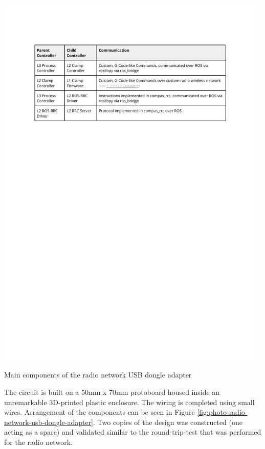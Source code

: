 \begin{table}
    \includegraphics[page=11, trim=25.4mm 185mm 25.4mm 33mm, clip, width=0.98\textwidth]{tables/Tables in Chapter 5.pdf}
    \caption{Main components of the radio network USB dongle adapter}
    \label{table:radio-network-usb-dongle-adapter-components}
\end{table}


The circuit is built on a 50mm x 70mm protoboard housed inside an unremarkable 3D-printed plastic enclosure. The wiring is completed using small wires. Arrangement of the components can be seen in Figure \ref{fig:photo-radio-network-usb-dongle-adapter}. Two copies of the design was constructed (one acting as a spare) and validated similar to the round-trip-test that was performed for the radio network. 

